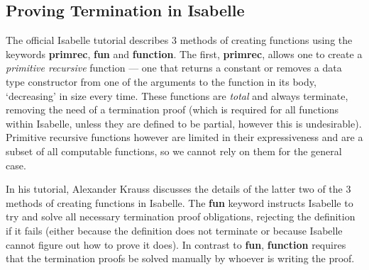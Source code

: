 \subsection{Proving Termination in Isabelle}


The official Isabelle tutorial\citep{IsabelleTutorial} describes 3 methods of creating functions using the keywords 
\textbf{primrec}, \textbf{fun} and \textbf{function}. The first, \textbf{primrec}, allows one to create a 
\textit{primitive recursive} function --- one that returns a constant or removes a data type constructor from one
of the arguments to the function in its body, `decreasing' in size every time. These functions are \textit{total}  
and  always terminate, removing the need of a termination proof (which is required  for all functions within Isabelle,
unless they are defined to be partial, however this is undesirable).
Primitive recursive functions however are limited in their expressiveness and are a subset of all computable
functions, so we cannot rely on them for the general case.

In his tutorial\liam{\textasciitilde}\citep{KraussIsabelle}, Alexander Krauss discusses the details of the latter two of the 3 methods
of creating functions in Isabelle. The \textbf{fun} keyword instructs Isabelle to try and solve all necessary
termination proof obligations, rejecting the definition if it fails (either because the definition does not 
terminate or because Isabelle cannot figure out how to prove it does). In contrast to \textbf{fun}, \textbf{function}
requires that the termination proofs be solved manually by whoever is writing the proof.


